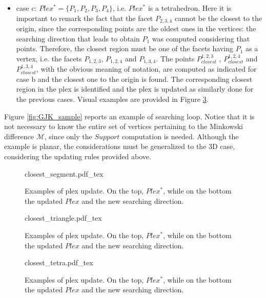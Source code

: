 \documentclass{article}
\begin{document}
\begin{itemize}
\item case c: $Plex^* = \lbrace P_1 , P_2, P_3, P_4 \rbrace$, i.e. $Plex^*$ is a tetrahedron.
Here it is important to remark the fact that the facet $P_{2,3,4}$ cannot be the closest to the origin, since the corresponding points are the oldest ones in the vertices: the searching direction that leads to obtain $P_1$ was computed considering that points. Therefore, the closest region must be one of the facets having $P_1$ as a vertex, i.e. the facets $P_{1,2,3}$, $P_{1,2,4}$ and $P_{1,3,4}$. The points $P^{1,2,3}_{closest}$ , $P^{1,2,4}_{closest}$  and $P^{1,3,4}_{closest}$, with the obvious meaning of notation, are computed as indicated for case b and the closest one to the origin is found. The corresponding closest region in the plex is identified and the plex is updated as similarly done for the previous cases. Visual examples are provided in Figure \ref{fig:update_tetra}.

\end{itemize}

Figure \ref{fig:GJK_sample} reports an example of searching loop.  Notice that it is not necessary to know the entire set of vertices pertaining to the Minkowski difference $\mathcal{M}$, since only the $Support$ computation is needed. Although the example is planar, the considerations must be generalized to the 3D case, considering the updating rules provided above.

\begin{figure}
	\centering
\def\svgwidth{0.55 \columnwidth}
{closest_segment.pdf_tex} 
	\caption{Examples of plex update. On the top, $Plex^*$, while on the bottom the updated $Plex$ and the new searching direction. }
	\label{fig:update_seg}
\end{figure} 

\begin{figure}
	\centering
\def\svgwidth{0.95 \columnwidth}
{closest_triangle.pdf_tex} 
	\caption{Examples of plex update. On the top, $Plex^*$, while on the bottom the updated $Plex$ and the new searching direction. }
	\label{fig:update_tri}
\end{figure} 

\begin{figure}
	\centering
\def\svgwidth{0.95 \columnwidth}
{closest_tetra.pdf_tex} 
	\caption{Examples of plex update. On the top, $Plex^*$, while on the bottom the updated $Plex$ and the new searching direction. }
	\label{fig:update_tetra}
\end{figure} 
\end{document}
